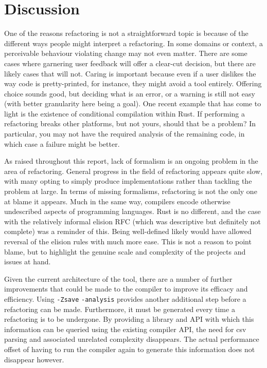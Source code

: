 \section{Discussion}

One of the reasons refactoring is not a straightforward topic is because of the different ways people might interpret a refactoring. In some domains or context, a perceivable behaviour violating change may not even matter. There are some cases where garnering user feedback will offer a clear-cut decision, but there are likely cases that will not. Caring is important because even if a user dislikes the way code is pretty-printed, for instance, they might avoid a tool entirely. Offering choice sounds good, but deciding what is an error, or a warning is still not easy (with better granularity here being a goal). One recent example that has come to light is the existence of conditional compilation within Rust. If performing a refactoring breaks other platforms, but not yours, should that be a problem? In particular, you may not have the required analysis of the remaining code, in which case a failure might be better.

As raised throughout this report, lack of formalism is an ongoing problem in the area of refactoring. General progress in the field of refactoring appears quite slow, with many opting to simply produce implementations rather than tackling the problem at large. In terms of missing formalisms, refactoring is not the only one at blame it appears. Much in the same way, compilers encode otherwise undescribed aspects of programming languages. Rust is no different, and the case with the relatively informal elision RFC (which was descriptive but definitely not complete) was a reminder of this. Being well-defined likely would have allowed reversal of the elision rules with much more ease. This is not a reason to point blame, but to highlight the genuine scale and complexity of the projects and issues at hand. 

Given the current architecture of the tool, there are a number of further improvements that could be made to the compiler to improve its efficacy and efficiency. Using {\verb|-Zsave| \verb|-analysis|} provides another additional step before a refactoring can be made. Furthermore, it must be generated every time a refactoring is to be undergone. By providing a library and API with which this information can be queried using the existing compiler API, the need for csv parsing and associated unrelated complexity disappears. The actual performance offset of having to run the compiler again to generate this information does not disappear however.  

